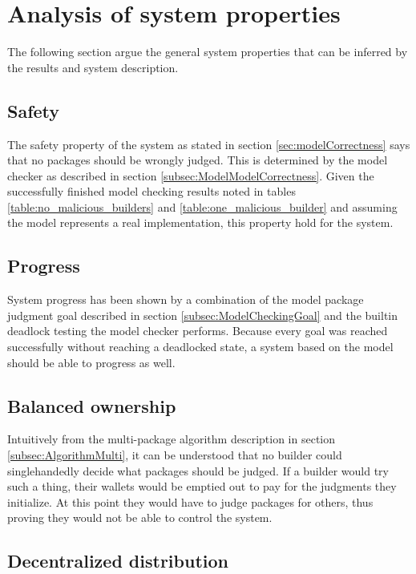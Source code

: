 \section{Analysis of system properties}

The following section argue the general system properties that can be inferred by the results and system description.

\subsection{Safety}
\label{subsec:AnalysisSafety}

The safety property of the system as stated in section \ref{sec:modelCorrectness} says that no packages should be wrongly judged. This is determined by the model checker as described in section \ref{subsec:ModelModelCorrectness}. Given the successfully finished model checking results noted in tables \ref{table:no_malicious_builders} and \ref{table:one_malicious_builder} and assuming the model represents a real implementation, this property hold for the system.

\subsection{Progress}
\label{subsec:AnalysisProgress}

System progress has been shown by a combination of the model package judgment goal described in section \ref{subsec:ModelCheckingGoal} and the builtin deadlock testing the model checker performs. Because every goal was reached successfully without reaching a deadlocked state, a system based on the model should be able to progress as well.

\subsection{Balanced ownership}
\label{subsec:AnalysisBalanced}

Intuitively from the multi-package algorithm description in section \ref{subsec:AlgorithmMulti}, it can be understood that no builder could singlehandedly decide what packages should be judged. If a builder would try such a thing, their wallets would be emptied out to pay for the judgments they initialize. At this point they would have to judge packages for others, thus proving they would not be able to control the system.

\subsection{Decentralized distribution}
\label{subsec:AnalysisDecentralized}

